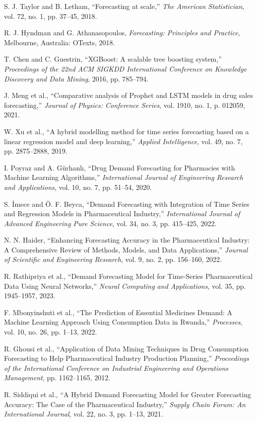 \documentclass[journal]{IEEEtran}
\begin{document}
\begin{thebibliography}{99}

S. J. Taylor and B. Letham, “Forecasting at scale,” \textit{The American Statistician}, vol. 72, no. 1, pp. 37–45, 2018.

R. J. Hyndman and G. Athanasopoulos, \textit{Forecasting: Principles and Practice}, Melbourne, Australia: OTexts, 2018.

T. Chen and C. Guestrin, “XGBoost: A scalable tree boosting system,” \textit{Proceedings of the 22nd ACM SIGKDD International Conference on Knowledge Discovery and Data Mining}, 2016, pp. 785–794.

J. Meng et al., “Comparative analysis of Prophet and LSTM models in drug sales forecasting,” \textit{Journal of Physics: Conference Series}, vol. 1910, no. 1, p. 012059, 2021.

W. Xu et al., “A hybrid modelling method for time series forecasting based on a linear regression model and deep learning,” \textit{Applied Intelligence}, vol. 49, no. 7, pp. 2875–2888, 2019.

I. Poyraz and A. Gürhanlı, “Drug Demand Forecasting for Pharmacies with Machine Learning Algorithms,” \textit{International Journal of Engineering Research and Applications}, vol. 10, no. 7, pp. 51–54, 2020.

S. İmece and Ö. F. Beyca, “Demand Forecasting with Integration of Time Series and Regression Models in Pharmaceutical Industry,” \textit{International Journal of Advanced Engineering Pure Science}, vol. 34, no. 3, pp. 415–425, 2022.

N. N. Haider, “Enhancing Forecasting Accuracy in the Pharmaceutical Industry: A Comprehensive Review of Methods, Models, and Data Applications,” \textit{Journal of Scientific and Engineering Research}, vol. 9, no. 2, pp. 156–160, 2022.

R. Rathipriya et al., “Demand Forecasting Model for Time-Series Pharmaceutical Data Using Neural Networks,” \textit{Neural Computing and Applications}, vol. 35, pp. 1945–1957, 2023.

F. Mbonyinshuti et al., “The Prediction of Essential Medicines Demand: A Machine Learning Approach Using Consumption Data in Rwanda,” \textit{Processes}, vol. 10, no. 26, pp. 1–13, 2022.

R. Ghousi et al., “Application of Data Mining Techniques in Drug Consumption Forecasting to Help Pharmaceutical Industry Production Planning,” \textit{Proceedings of the International Conference on Industrial Engineering and Operations Management}, pp. 1162–1165, 2012.

R. Siddiqui et al., “A Hybrid Demand Forecasting Model for Greater Forecasting Accuracy: The Case of the Pharmaceutical Industry,” \textit{Supply Chain Forum: An International Journal}, vol. 22, no. 3, pp. 1–13, 2021.

\end{thebibliography}




\end{document}
